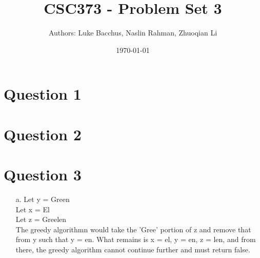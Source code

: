 \documentclass[12pt]{article}
\title{\textbf{CSC373 - Problem Set 3}}
\author{Authors: Luke Bacchus, Naslin Rahman, Zhuoqian Li}
\date{\today}
\begin{document}
\maketitle
\section*{Question 1}

\section*{Question 2}

\section*{Question 3} 
\begin{enumerate}
    \item[a.] Let y = Green\\
              Let x = El\\
              Let z = Greelen\\
 
              The greedy algorithmn would take the 'Gree' portion of z and remove that from y such that y = en.
              What remains is x = el, y = en, z = len, and from there, the greedy algorithm cannot continue further
              and must return false.


\end{enumerate}
\end{document}

